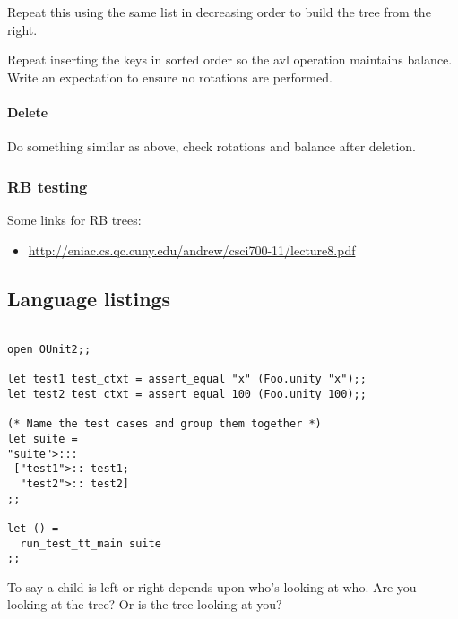 \documentclass{article}
\begin{document}
Repeat this using the same list in decreasing order to build the tree from the
right.

Repeat inserting the keys in sorted order so the avl operation maintains
balance. Write an expectation to ensure no rotations are performed.


\paragraph{Delete}

Do something similar as above, check
rotations and balance after deletion.


\subsubsection{RB testing}

Some links for RB trees:

\begin{itemize}
\item \href{http://eniac.cs.qc.cuny.edu/andrew/csci700-11/lecture8.pdf}{%
http://eniac.cs.qc.cuny.edu/andrew/csci700-11/lecture8.pdf}
\end{itemize}

\subsection{Language listings}

\begin{lstlisting}[frame=single]  % Start your code-block

open OUnit2;;

let test1 test_ctxt = assert_equal "x" (Foo.unity "x");;
let test2 test_ctxt = assert_equal 100 (Foo.unity 100);;

(* Name the test cases and group them together *)
let suite =
"suite">:::
 ["test1">:: test1;
  "test2">:: test2]
;;

let () =
  run_test_tt_main suite
;;
\end{lstlisting}

To say a child is left or right depends upon who's looking at who.
Are you looking at the tree? Or is the tree looking at you?
\end{document}
